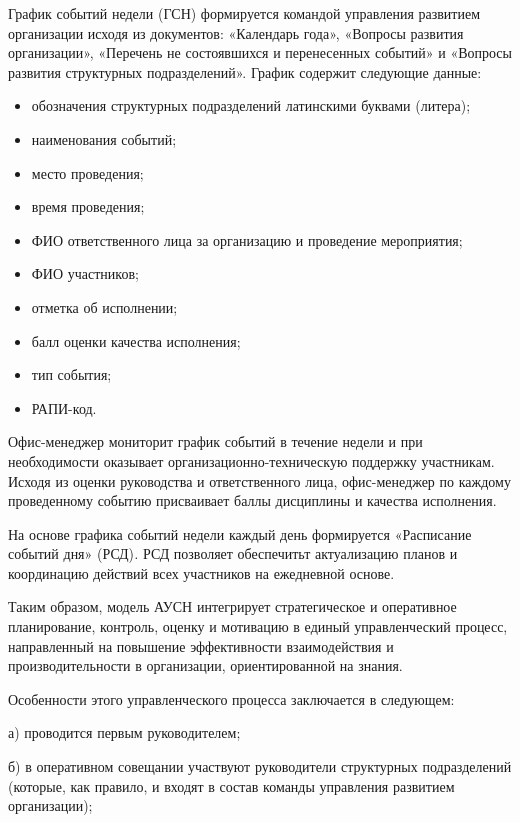 \begin{multicols}{2}

График событий недели (ГСН) формируется командой управления развитием
организации исходя из документов: «Календарь года», «Вопросы развития
организации», «Перечень не состоявшихся и перенесенных событий» и
«Вопросы развития структурных подразделений». График содержит следующие
данные:

\begin{itemize}[left=1cm]
\item
  обозначения структурных подразделений латинскими буквами (литера);
\item
  наименования событий;
\item
  место проведения;
\item
  время проведения;
\item
  ФИО ответственного лица за организацию и проведение мероприятия;
\item
  ФИО участников;
\item
  отметка об исполнении;
\item
  балл оценки качества исполнения;
\item
  тип события;
\item
  РАПИ-код.
\end{itemize}

Офис-менеджер мониторит график событий в течение недели и при
необходимости оказывает организационно-техническую поддержку участникам.
Исходя из оценки руководства и ответственного лица, офис-менеджер по
каждому проведенному событию присваивает баллы дисциплины и качества
исполнения.

На основе графика событий недели каждый день формируется «Расписание
событий дня» (РСД)\emph{.} РСД позволяет обеспечитьт актуализацию планов
и координацию действий всех участников на ежедневной основе.

Таким образом, модель АУСН интегрирует стратегическое и оперативное
планирование, контроль, оценку и мотивацию в единый управленческий
процесс, направленный на повышение эффективности взаимодействия и
производительности в организации, ориентированной на знания.

Особенности этого управленческого процесса заключается в следующем:

а) проводится первым руководителем;

б) в оперативном совещании участвуют руководители структурных
подразделений (которые, как правило, и входят в состав команды
управления развитием организации);


\end{multicols}
